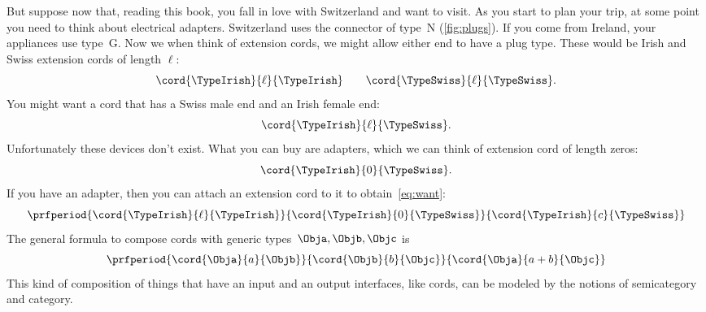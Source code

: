 But suppose now that, reading this book, you fall in love with Switzerland and want to visit.
As you start to plan your trip, at some point you need to think about electrical adapters.
Switzerland uses the connector of type~N (\cref{fig:plugs}).
If you come from Ireland, your appliances use type~G.
Now we when think of extension cords, we might allow either end to have a plug type.
%
These would be Irish and Swiss extension cords of length $\ell$:
%
\begin{equation}
    \label{eq:irish-swiss}
    \cord{\TypeIrish}{\ell}{\TypeIrish} \qquad \cord{\TypeSwiss}{\ell}{\TypeSwiss}.
\end{equation}
%
You might want a cord that has a Swiss male end and an Irish female end:
%
\begin{equation}
    \label{eq:want}
    \cord{\TypeIrish}{\ell}{\TypeSwiss}.
\end{equation}
%
Unfortunately these devices don't exist.
What you can buy are adapters, which we can think of extension cord of length zeros:
\begin{equation}
    \cord{\TypeIrish}{0}{\TypeSwiss}.
\end{equation}
%
If you have an adapter, then you can attach an extension cord to it to obtain~\cref{eq:want}:
%
\begin{equation}
    \label{eq:irish-swiss-result}
    \prfperiod{\cord{\TypeIrish}{\ell}{\TypeIrish}}{\cord{\TypeIrish}{0}{\TypeSwiss}}{\cord{\TypeIrish}{c}{\TypeSwiss}}
\end{equation}
%
The general formula to compose cords with generic types~$\Obja, \Objb, \Objc$ is
%
\begin{equation}
    \label{eq:cords-generic}
    \prfperiod{\cord{\Obja}{a}{\Objb}}{\cord{\Objb}{b}{\Objc}}{\cord{\Obja}{a+b}{\Objc}}
\end{equation}
%
This kind of composition of things that have an input and an output interfaces, like cords, can be modeled by the notions of semicategory and category.

%

%
%
%

